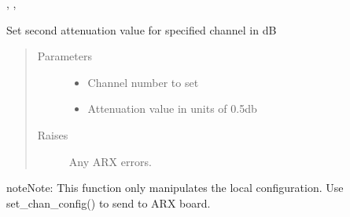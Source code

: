\documentclass[letterpaper,10pt,english]{sphinxmanual}
\begin{document}
\begin{fulllineitems}
\begin{fulllineitems}
\begin{quote}
\begin{description}
\end{description}\end{quote}




{\hyperref[\detokenize{index:lwautils.lwa_arx.ARX.show_chan_cfg}]{}}, {\hyperref[\detokenize{index:lwautils.lwa_arx.ARX.set_chan_cfg}]{}}, {\hyperref[\detokenize{index:lwautils.lwa_arx.ARX.set_chan_cfg_lowpass_narrow}]{}}



\end{fulllineitems}


\begin{fulllineitems}
\label{\detokenize{index:lwautils.lwa_arx.ARX.set_chan_cfg_second_atten}}
Set second attenuation value for specified channel in dB
\begin{quote}\begin{description}
\item[{Parameters}] \leavevmode\begin{itemize}
\item {} 
 \textendash{} Channel number to set

\item {} 
 \textendash{} Attenuation value in units of 0.5db

\end{itemize}

\item[{Raises}] \leavevmode
{} \textendash{} Any ARX errors.

\end{description}\end{quote}

\begin{sphinxadmonition}{note}{Note:}
This function only manipulates the local configuration.
Use set\_chan\_config() to send to ARX board.
\end{sphinxadmonition}



\end{fulllineitems}
\end{fulllineitems}
\end{document}
